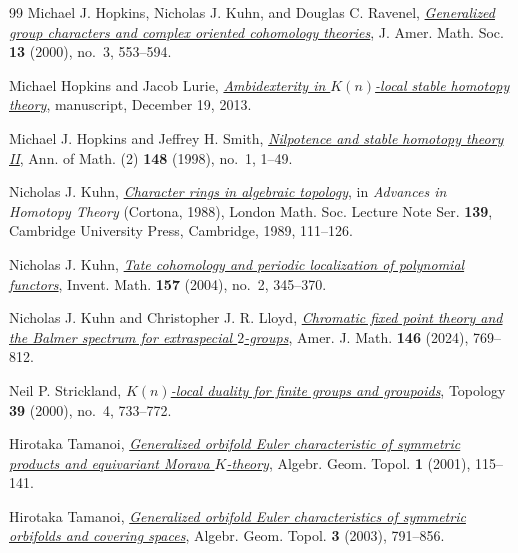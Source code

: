 \begin{thebibliography}{99}
Michael J. Hopkins, Nicholas J. Kuhn, and Douglas C. Ravenel,
\href{https://www.sas.rochester.edu/mth/sites/doug-ravenel/mypapers/hkr.pdf}
{\emph{Generalized group characters and complex oriented cohomology theories}},
J. Amer. Math. Soc. \textbf{13} (2000), no.~3, 553--594.

Michael Hopkins and Jacob Lurie,
\href{https://www.math.ias.edu/~lurie/papers/Ambidexterity.pdf}
{\emph{Ambidexterity in \(K(n)\)-local stable homotopy theory}},
manuscript, December 19, 2013.

Michael J. Hopkins and Jeffrey H. Smith,
\href{https://doi.org/10.2307/120991}
{\emph{Nilpotence and stable homotopy theory II}},
Ann. of Math. (2) \textbf{148} (1998), no.~1, 1--49.

Nicholas J. Kuhn,
\href{https://doi.org/10.1017/CBO9780511662614.012}
{\emph{Character rings in algebraic topology}},
in \emph{Advances in Homotopy Theory} (Cortona, 1988),
London Math. Soc. Lecture Note Ser. \textbf{139},
Cambridge University Press, Cambridge, 1989, 111--126.

Nicholas J. Kuhn,
\href{https://doi.org/10.1007/s00222-003-0354-z}
{\emph{Tate cohomology and periodic localization of polynomial functors}},
Invent. Math. \textbf{157} (2004), no.~2, 345--370.

Nicholas J. Kuhn and Christopher J. R. Lloyd,
\href{https://preprint.press.jhu.edu/ajm/sites/default/files/AJM-kuhn-lloyd-FINAL.pdf}
{\emph{Chromatic fixed point theory and the Balmer spectrum for extraspecial \(2\)-groups}},
Amer. J. Math. \textbf{146} (2024), 769--812.

Neil P. Strickland,
\href{https://doi.org/10.1016/S0040-9383(99)00031-2}
{\emph{\(K(n)\)-local duality for finite groups and groupoids}},
Topology \textbf{39} (2000), no.~4, 733--772.

Hirotaka Tamanoi,
\href{https://doi.org/10.2140/agt.2001.1.115}
{\emph{Generalized orbifold Euler characteristic of symmetric products and equivariant Morava \(K\)-theory}},
Algebr. Geom. Topol. \textbf{1} (2001), 115--141.

Hirotaka Tamanoi,
\href{https://doi.org/10.2140/agt.2003.3.791}
{\emph{Generalized orbifold Euler characteristics of symmetric orbifolds and covering spaces}},
Algebr. Geom. Topol. \textbf{3} (2003), 791--856.

\end{thebibliography}
